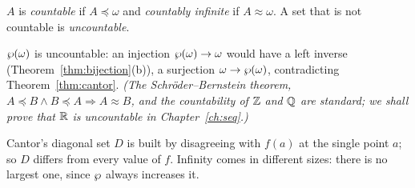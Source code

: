 \begin{definition}
	$A$ is \emph{countable} if $A\preceq\omega$ and \emph{countably infinite} if $A\approx\omega$. A set that is not countable is \emph{uncountable}.
\end{definition}

\begin{corollary}
	$\wp(\omega)$ is uncountable: an injection $\wp(\omega)\to\omega$ would have a left inverse (Theorem~\ref{thm:bijection}(b)), a surjection $\omega\to\wp(\omega)$, contradicting Theorem~\ref{thm:cantor}. \emph{(The Schr\"oder--Bernstein theorem, $A\preceq B\wedge B\preceq A\Rightarrow A\approx B$, and the countability of $\mathbb{Z}$ and $\mathbb{Q}$ are standard; we shall prove that $\mathbb{R}$ is uncountable in Chapter~\ref{ch:seq}.)}
\end{corollary}

\begin{intuition}
	Cantor's diagonal set $D$ is built by disagreeing with $f(a)$ at the single point $a$; so $D$ differs from every value of $f$. Infinity comes in different sizes: there is no largest one, since $\wp$ always increases it.
\end{intuition}